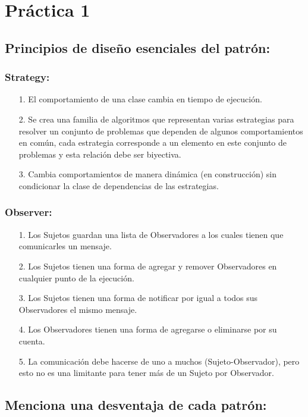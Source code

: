 \documentclass{article}
\begin{document}
	
	\section*{\LARGE{Práctica 1}}

\subsection*{Principios de diseño esenciales del patrón:}

\subsubsection*{Strategy:}
\begin{itemize}
\item[1.] El comportamiento de una clase cambia en tiempo de ejecución.
\item[2.] Se crea una familia de algoritmos que representan varias estrategias para resolver un conjunto de problemas que dependen de algunos comportamientos en común, cada estrategia corresponde a un elemento en este conjunto de problemas y esta relación debe ser biyectiva.
\item[3.] Cambia comportamientos de manera dinámica (en construcción) sin condicionar la clase de dependencias de las estrategias.
\end{itemize}

\subsubsection*{Observer:}
\begin{itemize}
\item[1.] Los Sujetos guardan una lista de Observadores a los cuales tienen que comunicarles un mensaje.
\item[2.] Los Sujetos tienen una forma de agregar y remover Observadores en cualquier punto de la ejecución.
\item[3.] Los Sujetos tienen una forma de notificar por igual a todos sus Observadores el mismo mensaje.
\item[4.] Los Observadores tienen una forma de agregarse o eliminarse por su cuenta.
\item[5.] La comunicación debe hacerse de uno a muchos (Sujeto-Observador), pero esto no es una limitante para tener más de un Sujeto por Observador.
\end{itemize}

\subsection*{Menciona una desventaja de cada patrón:}
\end{document}
